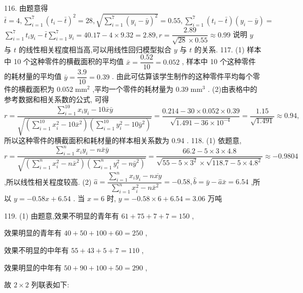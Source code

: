 116. 由题意得 $\bar{t} = 4,\mathop{\sum }\limits_{{i = 1}}^{7}{\left( {t}_{i} - \bar{t}\right) }^{2} = {28},\sqrt{\mathop{\sum }\limits_{{i = 1}}^{7}{\left( {y}_{i} - \bar{y}\right) }^{2}} = {0.55},\mathop{\sum }\limits_{{i = 1}}^{7}\left( {{t}_{i} - \bar{t}}\right) \left( {{y}_{i} - \bar{y}}\right)  =$  $\mathop{\sum }\limits_{{i = 1}}^{7}{t}_{i}{y}_{i} - \bar{t}\mathop{\sum }\limits_{{i = 1}}^{7}{y}_{i} = {40.17} - 4 \times  {9.32} = {2.89},r = \dfrac{2.89}{\sqrt{28} \times  {0.55}} \approx  {0.99}$ 说明 $y$ 与 $t$ 的线性相关程度相当高,可以用线性回归模型拟合 $y$ 与 $t$ 的关系. 117. (1) 样本中 10 个这种零件的横截面积的平均值 $\bar{x} = \dfrac{0.52}{10} = {0.052}$ , 样本中 10 个这种零件的耗材量的平均值 $\bar{y} = \dfrac{3.9}{10} = {0.39}$ . 由此可估算该学生制作的这种零件平均每个零件的横截面积为 ${0.052}{\mathrm{\;{mm}}}^{2}$ ,平均一个零件的耗材量为 ${0.39}{\mathrm{\;{mm}}}^{3}$ . (2)由表格中的参考数据和相关系数的公式, 可得 $r = \dfrac{\mathop{\sum }\limits_{{i = 1}}^{{10}}{x}_{i}{y}_{i} - {10}\bar{x}\bar{y}}{\sqrt{\left( {\mathop{\sum }\limits_{{i = 1}}^{{10}}{x}_{i}^{2} - {10}{\bar{x}}^{2}}\right) \left( {\mathop{\sum }\limits_{{i = 1}}^{{10}}{y}_{i}^{2} - {10}{\bar{y}}^{2}}\right) }} = \dfrac{{0.214} - {30} \times  {0.052} \times  {0.39}}{\sqrt{{1.491} - {36} \times  {10}^{-4}}} = \dfrac{1.15}{\sqrt{1.491}} \approx  {0.94},$ 所以这种零件的横截面积和耗材量的样本相关系数为 0.94 . 118. (1) 依题意, $r = \dfrac{\mathop{\sum }\limits_{{i = 1}}^{n}{x}_{i}{y}_{i} - n\bar{x}\bar{y}}{\sqrt{\left( {\mathop{\sum }\limits_{{i = 1}}^{n}{x}_{i}^{2} - n{\bar{x}}^{2}}\right) \left( {\mathop{\sum }\limits_{{i = 1}}^{n}{y}_{i}^{2} - n{\bar{y}}^{2}}\right) }} = \dfrac{{66.2} - 5 \times  3 \times  {4.8}}{\sqrt{{55} - 5 \times  {3}^{2}} \times  \sqrt{{118.7} - 5 \times  {4.8}^{2}}} \approx   - {0.9804}$ ,所以线性相关程度较高. (2) $\widehat{a} = \dfrac{\mathop{\sum }\limits_{{i = 1}}^{n}{x}_{i}{y}_{i} - n\overline{xy}}{\mathop{\sum }\limits_{{i = 1}}^{n}{x}_{i}^{2} - n{\bar{x}}^{2}} =  - {0.58},\widehat{b} = \bar{y} - \widehat{a}\bar{x} = {6.54}$ ,所以 $y =  - {0.58x} + {6.54}$ . 当 $x = 6$ 时, $y =  - {0.58} \times  6 + {6.54} = {3.06}$ 万吨

119. (1) 由题意,效果不明显的青年有 ${61} + {75} + 7 + 7 = {150}$ ,

效果明显的青年有 ${40} + {50} + {100} + {60} = {250}$ ,

效果不明显的中年有 ${55} + {43} + 5 + 7 = {110}$ ,

效果明显的中年有 ${50} + {90} + {100} + {50} = {290}$ ,

故 $2 \times  2$ 列联表如下:

